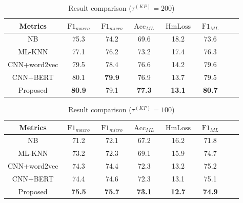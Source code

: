 \begin{table}[htbp!]
	\caption{Result comparison (\(\tau^{(KP)}=200 \))}\label{tbl:bsline1}
	\centering
	\begin{tabular}{cccccccc}
		\toprule
		Metrics      & \(\operatorname{F1}_{macro}\) & \(\operatorname{F1}_{micro}\) & \(\operatorname{Acc}_{ML}\) & \(\operatorname{HmLoss}\) & \(\operatorname{F1}_{ML}\) \\
		\midrule
		NB           & 75.3                          & 74.2                          & 69.6                        & 18.2                      & 73.6                       \\
		ML-KNN       & 77.1                          & 76.2                          & 73.2                        & 17.4                      & 76.3                       \\
		CNN+word2vec & 79.5                          & 78.4                          & 76.6                        & 14.2                      & 79.6                       \\
		CNN+BERT     & 80.1                          & \textbf{79.9}                 & 76.9                        & 13.7                      & 79.5                       \\
		Proposed     & \textbf{80.9}                 & 79.1                          & \textbf{77.3}               & \textbf{13.1}             & \textbf{80.7}              \\
		\bottomrule
	\end{tabular}
\end{table}


\begin{table}
	\centering
	\caption{Result comparison (\(\tau^{(KP)}=100 \))}\label{tbl:bsline2}
	\begin{tabular}{cccccccc}
		\toprule
		Metrics      & \(\operatorname{F1}_{macro}\) & \(\operatorname{F1}_{micro}\) & \(\operatorname{Acc}_{ML}\) & \(\operatorname{HmLoss}\) & \(\operatorname{F1}_{ML}\) \\
		\midrule
		NB           & 71.2                          & 72.1                          & 67.2                        & 16.2                      & 71.8                       \\
		ML-KNN       & 73.2                          & 72.3                          & 69.1                        & 15.9                      & 74.7                       \\
		CNN+word2vec & 74.3                          & 74.4                          & 72.3                        & 13.2                      & 75.2                       \\
		CNN+BERT     & 74.4                          & 74.6                          & 72.3                        & 13.1                      & 75.1                       \\
		Proposed     & \textbf{75.5}                 & \textbf{75.7}                 & \textbf{73.1}               & \textbf{12.7}             & \textbf{74.9}              \\
		\bottomrule
	\end{tabular}
\end{table}

